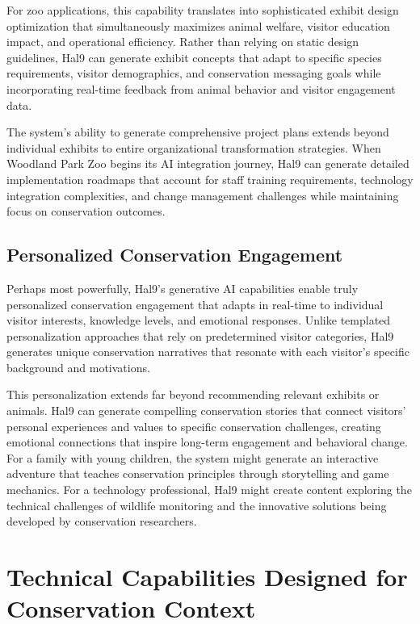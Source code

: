 \documentclass[
  Letterpaper,
]{scrbook}
\begin{document}
For zoo applications, this capability translates into sophisticated
exhibit design optimization that simultaneously maximizes animal
welfare, visitor education impact, and operational efficiency. Rather
than relying on static design guidelines, Hal9 can generate exhibit
concepts that adapt to specific species requirements, visitor
demographics, and conservation messaging goals while incorporating
real-time feedback from animal behavior and visitor engagement data.

The system's ability to generate comprehensive project plans extends
beyond individual exhibits to entire organizational transformation
strategies. When Woodland Park Zoo begins its AI integration journey,
Hal9 can generate detailed implementation roadmaps that account for
staff training requirements, technology integration complexities, and
change management challenges while maintaining focus on conservation
outcomes.

\subsection{Personalized Conservation
Engagement}\label{personalized-conservation-engagement}

Perhaps most powerfully, Hal9's generative AI capabilities enable truly
personalized conservation engagement that adapts in real-time to
individual visitor interests, knowledge levels, and emotional responses.
Unlike templated personalization approaches that rely on predetermined
visitor categories, Hal9 generates unique conservation narratives that
resonate with each visitor's specific background and motivations.

This personalization extends far beyond recommending relevant exhibits
or animals. Hal9 can generate compelling conservation stories that
connect visitors' personal experiences and values to specific
conservation challenges, creating emotional connections that inspire
long-term engagement and behavioral change. For a family with young
children, the system might generate an interactive adventure that
teaches conservation principles through storytelling and game mechanics.
For a technology professional, Hal9 might create content exploring the
technical challenges of wildlife monitoring and the innovative solutions
being developed by conservation researchers.

\section{Technical Capabilities Designed for Conservation
Context}\label{technical-capabilities-designed-for-conservation-context}
\end{document}
